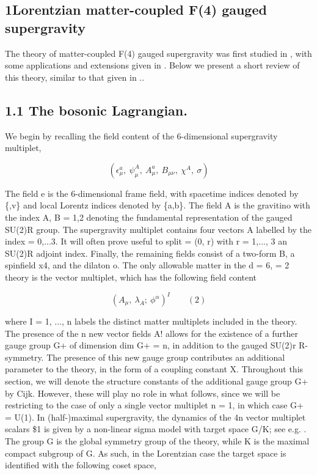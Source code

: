 \documentclass{article}
\begin{document}
\sloppy

\subsection*{1Lorentzian matter-coupled F(4) gauged supergravity}


The theory of matter-coupled F(4) gauged supergravity was first studied in , with some
applications and extensions given in . Below we present a short review of this theory, similar
to that given in ..


\subsection*{1.1 The bosonic Lagrangian.}


We begin by recalling the field content of the 6-dimensional supergravity multiplet,


\begin{equation}
( \epsilon _ { \mu } ^ { a }, ~ \psi _ { \mu } ^ { A }, ~ A _ { \mu } ^ { a }, ~ B _ { \mu \nu }, ~ \chi ^ { A }, ~ \sigma )
\end{equation}


The field e is the 6-dimensional frame field, with spacetime indices denoted by \{,v\}
and local Lorentz indices denoted by \{a,b\}. The field A is the gravitino with the index
A, B = 1,2 denoting the fundamental representation of the gauged SU(2)R group. The
supergravity multiplet contains four vectors A labelled by the index  = 0,...3. It will
often prove useful to split  = (0, r) with r = 1,..., 3 an SU(2)R adjoint index. Finally, the
remaining fields consist of a two-form B, a spinfield x4, and the dilaton o. The only
allowable matter in the d = 6,  = 2 theory is the vector multiplet, which has the following
field content


\begin{equation}
( A _ { \mu }, ~ \lambda _ { A } ; ~ \phi ^ { \alpha } ) ^ { I } \qquad ( 2 )
\end{equation}


where I = 1, ..., n labels the distinct matter multiplets included in the theory. The presence
of the n new vector fields A! allows for the existence of a further gauge group G+ of dimension
dim G+ = n, in addition to the gauged SU(2)r R-symmetry. The presence of this new gauge
group contributes an additional parameter to the theory, in the form of a coupling constant
X. Throughout this section, we will denote the structure constants of the additional gauge
group G+ by Cijk. However, these will play no role in what follows, since we will be
restricting to the case of only a single vector multiplet n = 1, in which case G+ = U(1).
In (half-)maximal supergravity, the dynamics of the 4n vector multiplet scalars \$1 is given
by a non-linear sigma model with target space G/K; see e.g. . The group G is the global
symmetry group of the theory, while K is the maximal compact subgroup of G. As such, in
the Lorentzian case the target space is identified with the following coset space,
\end{document}
